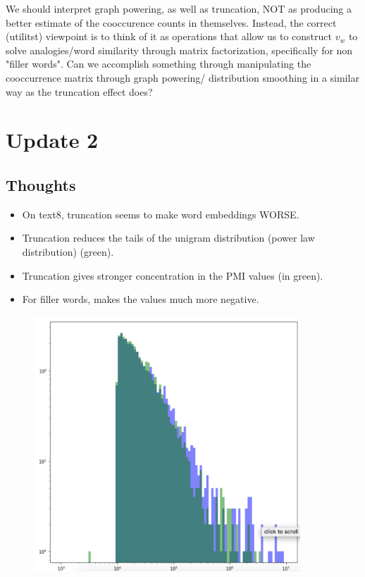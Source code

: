 \documentclass[12pt]{article}
\begin{document}
We should interpret graph powering, as well as truncation, NOT as producing a better estimate of the cooccurence counts in themselves. Instead, the correct (utilitst) viewpoint is to think of it as operations that allow us to construct $v_w$ to solve analogies/word similarity through matrix factorization, specifically for non "filler words". Can we accomplish something through manipulating the cooccurrence matrix through graph powering/ distribution smoothing in a similar way as the truncation effect does?

\section{Update 2}

\subsection{Thoughts}
\begin{itemize}
\item On text8, truncation seems to make word embeddings WORSE. 
\item Truncation reduces the tails of the unigram distribution (power law distribution) (green).
\item Truncation gives stronger concentration in the PMI values (in green).
\item For filler words, makes the values much more negative. 
\end{itemize}

\begin{figure}[h]
\centering
\includegraphics[width=10cm]{powerlawtext8.png}
\end{figure}
\end{document}
